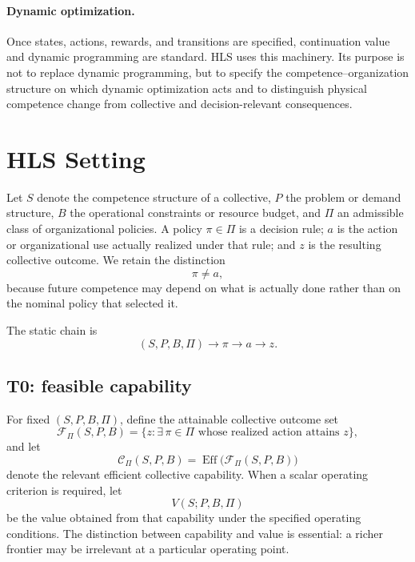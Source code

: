 \documentclass[10pt]{article}
\newcommand{\Ccap}{\mathcal{C}}
\begin{document}
\paragraph{Dynamic optimization.}
Once states, actions, rewards, and transitions are specified, continuation value and dynamic programming are standard. HLS uses this machinery. Its purpose is not to replace dynamic programming, but to specify the competence--organization structure on which dynamic optimization acts and to distinguish physical competence change from collective and decision-relevant consequences.

\section{HLS Setting}

Let $S$ denote the competence structure of a collective, $P$ the problem or demand structure, $B$ the operational constraints or resource budget, and $\Pi$ an admissible class of organizational policies. A policy $\pi\in\Pi$ is a decision rule; $a$ is the action or organizational use actually realized under that rule; and $z$ is the resulting collective outcome. We retain the distinction
\begin{equation}
\pi \neq a,
\end{equation}
because future competence may depend on what is actually done rather than on the nominal policy that selected it.

The static chain is
\begin{equation}
(S,P,B,\Pi) \longrightarrow \pi \longrightarrow a \longrightarrow z.
\end{equation}

\subsection{T0: feasible capability}

For fixed $(S,P,B,\Pi)$, define the attainable collective outcome set
\begin{equation}
\mathcal{F}_{\Pi}(S,P,B)
 = \{z:\exists\,\pi\in\Pi\text{ whose realized action attains }z\},
\end{equation}
and let
\begin{equation}
\Ccap_{\Pi}(S,P,B)
 = \operatorname{Eff}\bigl(\mathcal{F}_{\Pi}(S,P,B)\bigr)
\end{equation}
denote the relevant efficient collective capability. When a scalar operating criterion is required, let
\begin{equation}
V(S;P,B,\Pi)
\end{equation}
be the value obtained from that capability under the specified operating conditions. The distinction between capability and value is essential: a richer frontier may be irrelevant at a particular operating point.
\end{document}
